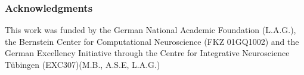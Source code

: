 \documentclass{article} %
\begin{document}
\subsubsection*{Acknowledgments}
This work was funded by the German National Academic Foundation (L.A.G.), the Bernstein Center for Computational Neuroscience (FKZ 01GQ1002) and the German Excellency Initiative through the Centre for Integrative Neuroscience T\"ubingen (EXC307)(M.B., A.S.E, L.A.G.)
\small{

}
\end{document}
